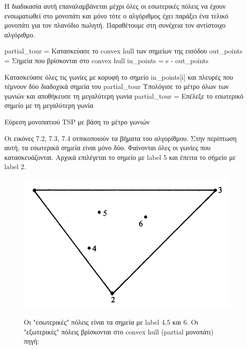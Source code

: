 \documentclass[oneside,12pt]{book}
\newenvironment{matlab}
	{\begin{figure}[hp]\centering\captionsetup{justification=centering}}
	{\end{figure}}
\theoremstyle{definition}
\begin{document}
Η διαδικασία αυτή επαναλαμβάνεται μέχρι όλες οι εσωτερικές πόλεις να έχουν ενσωματωθεί στο μονοπάτι και μόνο τότε ο αλγόριθμος έχει παράξει ένα τελικό μονοπάτι για τον πλανόδιο πωλητή. Παραθέτουμε στη συνέχεια τον αντίστοιχο αλγόριθμο. \\

\begin{algorithm}[H]
	\SetAlgoLined
	
	partial\_tour = Κατασκεύασε το convex hull των σημείων της εισόδου \;
	out\_points = Σημεία που βρίσκονται στο convex hull \;
	in\_points = s - out\_points \;
	
	{
		{
			Κατασκεύασε όλες τις γωνίες με κορυφή το σημείο in\_points[i] και πλευρές που τέμνουν δύο διαδοχικά σημεία του partial\_tour \; 
			Υπολόγισε το μέτρο όλων των γωνιών και αποθήκευσε τη μεγαλύτερη γωνία \;
		}
		partial\_tour = Επέλεξε το εσωτερικό σημείο με τη μεγαλύτερη γωνία \;
	}
		
	\caption{Εύρεση μονοπατιού TSP με βάση το μέτρο γωνιών}
\end{algorithm}

Οι εικόνες 7.2, 7.3, 7.4 οτπικοποιούν τα βήματα του αλγορίθμου. Στην περίπτωση αυτή, τα εσωτερικά σημεία είναι μόνο δύο. Φαίνονται όλες οι γωνίες που κατασκευάζονται. Αρχικά επιλέγεται το σημείο με label 5 και έπειτα το σήμείο με label 2. \\

\begin{matlab}
	\includegraphics[scale=0.5]{images/geometric_approach_angle1.png}
	\caption{Οι "εσωτερικές" πόλεις είναι τα σημεία με label 4,5 και 6. Οι "εξωτερικές" πόλεις βρίσκονται στο convex hull (partial μονοπάτι)\\ πηγή: \cite{16}}
\end{matlab} 
\end{document}
